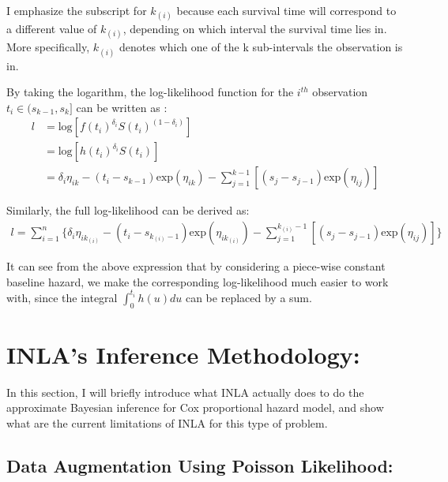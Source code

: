 \documentclass[]{article}
\begin{document}
I emphasize the subscript for \(k_{(i)}\) because each survival time
will correspond to a different value of \(k_{(i)}\), depending on which
interval the survival time lies in. More specifically, \(k_{(i)}\)
denotes which one of the k sub-intervals the observation is in.

By taking the logarithm, the log-likelihood function for the \(i^{th}\)
observation \(t_i \in (s_{k-1},s_k]\) can be written as :
\begin{equation}\begin{aligned}\label{eqn:loglike}
l &= \text{log}[f(t_i)^{\delta_i}S(t_i)^{(1-\delta_i)}] \\
  &= \text{log}[h(t_i)^{\delta_i}S(t_i)]\\
  &= \delta_i \eta_{ik} - (t_i-s_{k-1})\text{exp}(\eta_{ik})-\sum_{j=1}^{k-1} [(s_{j}-s_{j-1})\text{exp}(\eta_{ij})]
\end{aligned}\end{equation}

Similarly, the full log-likelihood can be derived as:
\begin{equation}\begin{aligned}\label{eqn:fullloglike1}
l = \sum_{i=1}^{n} \bigg \{ \delta_i \eta_{ik_{(i)}} - (t_i-s_{k_{(i)}-1})\text{exp}(\eta_{ik_{(i)}})-\sum_{j=1}^{{k_{(i)}}-1} [(s_{j}-s_{j-1})\text{exp}(\eta_{ij})]\bigg \}
\end{aligned}\end{equation}

It can see from the above expression that by considering a piece-wise
constant baseline hazard, we make the corresponding log-likelihood much
easier to work with, since the integral \(\int_{0}^{t_i} h(u)du\) can be
replaced by a sum.

\hypertarget{inlas-inference-methodology}{%
\section{INLA's Inference
Methodology:}\label{inlas-inference-methodology}}

In this section, I will briefly introduce what INLA actually does to do
the approximate Bayesian inference for Cox proportional hazard model,
and show what are the current limitations of INLA for this type of
problem.

\hypertarget{data-augmentation-using-poisson-likelihood}{%
\subsection{Data Augmentation Using Poisson
Likelihood:}\label{data-augmentation-using-poisson-likelihood}}
\end{document}
